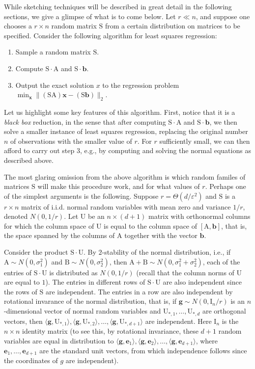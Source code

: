 \documentclass[11pt]{article}
\newcommand{\mat}[1]{{\ensuremath{\bm{\mathrm{#1}}}}}
\def\b{{\mathbf b}}
\def\e{{\mathbf e}}
\def\matA{\mat{A}}
\def\matB{\mat{B}}
\def\matI{\mat{I}}
\def\matS{\mat{S}}
\def\matU{\mat{U}}
\def\g{{\mathbf g}}
\def\x{{\mathbf x}}
\def\b{{\mathbf b}}
\newcommand{\eps}{\varepsilon}
\begin{document}
While sketching techniques will be described in great detail in the following sections,
we give a glimpse of what is to come below. Let $r \ll n$, 
and suppose one chooses a
$r \times n$ random matrix $\matS$ from a certain distribution on matrices
to be specified. 
Consider the following algorithm for least squares regression: 
\begin{enumerate}
\item Sample a random matrix $\matS$.
\item Compute $\matS \cdot \matA$ and $\matS \cdot \b$.
\item Output the exact solution $x$ to the regression problem $\min_{\x} \|(\matS \matA)\x-(\mat S\b)\|_2$. 
\end{enumerate}
Let us highlight some key features of this algorithm. First, notice that it is a 
{\it black box} reduction, in the sense that after computing $\matS \cdot \matA$
and $\matS \cdot \b$, we then solve a smaller instance of least squares regression,
replacing the original number $n$ of observations with the smaller value of $r$. For
$r$ sufficiently small, we can then afford to carry out step 3, e.g., by computing
and solving the normal equations as described above. 

The most glaring omission from the above algorithm is which random familes of matrices
$\matS$ will make this procedure work, and for what values of $r$. Perhaps one of the
simplest arguments is the following. Suppose $r = \Theta(d/\eps^2)$ and $\matS$
is a $r \times n$ matrix of i.i.d. normal random variables with mean 
zero and variance $1/r$, denoted $N(0,1/r)$. Let $\matU$ be an $n \times (d+1)$
matrix with orthonormal columns for which the column space of $\matU$ is equal to
the column space of $[\matA, \b]$, that is, the space spanned by the columns of $\matA$
together with the vector $\b$. 

Consider the product $\matS \cdot \matU$. By $2$-stability of the normal
distribution, i.e., if $\matA \sim N(0, \sigma_1^2)$ and $\matB \sim N(0, \sigma_2^2)$,
then $\matA+\matB \sim N(0, \sigma_1^2 + \sigma_2^2)$, each of the entries of $\matS \cdot \matU$
is distributed as $N(0, 1/r)$ (recall that the column norms of $\matU$ are equal to $1$). 
The entries in different rows of $\matS \cdot \matU$ are also independent
since the rows of $\matS$ are independent. The entries in a row
are also independent by rotational invarance of the normal distribution, that is,
if $\g \sim N(0, \matI_n/r)$ is an $n$-dimensional vector of normal random variables
and $\matU_{*,1}, \ldots, \matU_{*,d}$ are orthogonal vectors, then $\langle \g, \matU_{*,1} \rangle,
\langle \g, \matU_{*,2} \rangle, \ldots, \langle \g, \matU_{*,d+1} \rangle$ are independent. 
Here $\matI_n$ is the $n \times n$ identity matrix
(to see this, by rotational invariance, these $d+1$ random variables are equal in
distribution to $\langle \g, \e_1 \rangle, \langle \g, \e_2 \rangle, \ldots,
\langle \g, \e_{d+1} \rangle$, where $\e_1, \ldots, \e_{d+1}$ are the standard unit vectors,
from which independence follows since the coordinates of $g$ are independent). 
\end{document}
